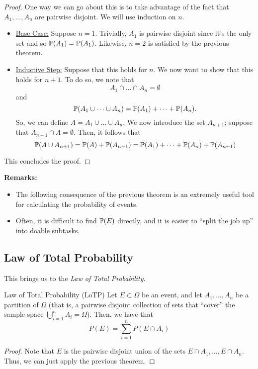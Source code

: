 \begin{proof}
    One way we can go about this is to take advantage of the fact that $A_1, \dots, A_n$ are pairwise disjoint. We will use induction on $n$. 
    \begin{itemize}
        \item \underline{Base Case:} Suppose $n = 1$. Trivially, $A_1$ is pairwise disjoint since it's the only set and so $\mathbb{P}(A_1) = \mathbb{P}(A_1)$. Likewise, $n = 2$ is satisfied by the previous theorem.
        
        \item \underline{Inductive Step:} Suppose that this holds for $n$. We now want to show that this holds for $n + 1$. To do so, we note that 
        \[A_1 \cap \dots \cap A_n = \emptyset\]
        and 
        \[\mathbb{P}(A_1 \cup \dots \cup A_n) = \mathbb{P}(A_1) + \dots + \mathbb{P}(A_n).\]
        So, we can define $A = A_1 \cup \dots \cup A_n$. We now introduce the set $A_{n + 1}$; suppose that $A_{n + 1} \cap A = \emptyset$. Then, it follows that 
        \[\mathbb{P}(A \cup A_{n + 1}) = \mathbb{P}(A) + \mathbb{P}(A_{n + 1}) = \mathbb{P}(A_1) + \dots + \mathbb{P}(A_n) + \mathbb{P}(A_{n + 1})\]
    \end{itemize}
    This concludes the proof.
\end{proof}

\textbf{Remarks:}
\begin{itemize}
    \item The following consequence of the previous theorem is an extremely useful tool for calculating the probability of events. 
    \item Often, it is difficult to find $\mathbb{P}(E)$ directly, and it is easier to ``split the job up'' into doable subtasks. 
\end{itemize}

\subsection{Law of Total Probability}
This brings us to the \emph{Law of Total Probability}. 
\begin{theorem}{Law of Total Probability (LoTP)}{}
    Let $E \subset \Omega$ be an event, and let $A_1, \dots, A_n$ be a partition of $\Omega$ (that is, a pairwise disjoint collection of sets that ``cover'' the sample space $\bigcup_{i = 1}^n A_i = \Omega$). Then, we have that 
    \[P(E) = \sum_{i = 1}^{n} P(E \cap A_i)\]
\end{theorem}

\begin{mdframed}[]
    \begin{proof}
        Note that $E$ is the pairwise disjoint union of the sets $E \cap A_1, \dots, E \cap A_n$. Thus, we can just apply the previous theorem. 
    \end{proof}
\end{mdframed}

